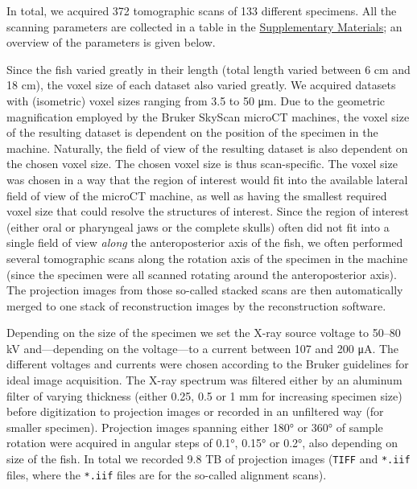 In total, we acquired 372 tomographic scans of 133 different specimens.
All the scanning parameters are collected in a table in the \protect\hyperlink{supplementary-materials}{Supplementary Materials}; an overview of the parameters is given below.

Since the fish varied greatly in their length (total length varied between 6 cm and 18 cm), the voxel size of each dataset also varied greatly.
We acquired datasets with (isometric) voxel sizes ranging from 3.5 to 50 μm.
Due to the geometric magnification employed by the Bruker SkyScan microCT machines, the voxel size of the resulting dataset is dependent on the position of the specimen in the machine.
Naturally, the field of view of the resulting dataset is also dependent on the chosen voxel size.
The chosen voxel size is thus scan-specific.
The voxel size was chosen in a way that the region of interest would fit into the available lateral field of view of the microCT machine, as well as having the smallest required voxel size that could resolve the structures of interest.
Since the region of interest (either oral or pharyngeal jaws or the complete skulls) often did not fit into a single field of view \emph{along} the anteroposterior axis of the fish, we often performed several tomographic scans along the rotation axis of the specimen in the machine (since the specimen were all scanned rotating around the anteroposterior axis).
The projection images from those so-called stacked scans are then automatically merged to one stack of reconstruction images by the reconstruction software.

Depending on the size of the specimen we set the X-ray source voltage to 50--80 kV and---depending on the voltage---to a current between 107 and 200 μA.
The different voltages and currents were chosen according to the Bruker guidelines for ideal image acquisition.
The X-ray spectrum was filtered either by an aluminum filter of varying thickness (either 0.25, 0.5 or 1 mm for increasing specimen size) before digitization to projection images or recorded in an unfiltered way (for smaller specimen).
Projection images spanning either 180° or 360° of sample rotation were acquired in angular steps of 0.1°, 0.15° or 0.2°, also depending on size of the fish.
In total we recorded 9.8 TB of projection images (\texttt{TIFF} and \texttt{*.iif} files, where the \texttt{*.iif} files are for the so-called alignment scans).

